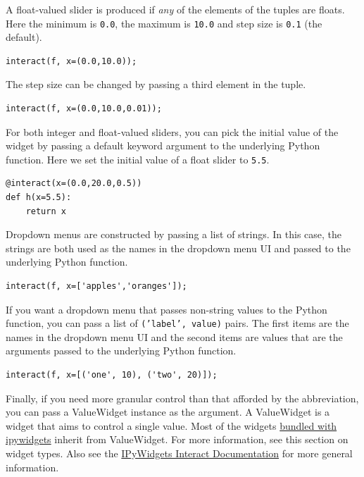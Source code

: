 A float-valued slider is produced if \textit{any} of the elements of the tuples are floats. Here the minimum is \texttt{0.0}, the maximum is \texttt{10.0} and step size is \texttt{0.1} (the default).

\begin{verbatim}
interact(f, x=(0.0,10.0));
\end{verbatim}

The step size can be changed by passing a third element in the tuple.

\begin{verbatim}
interact(f, x=(0.0,10.0,0.01));
\end{verbatim}

For both integer and float-valued sliders, you can pick the initial value of the widget by passing a default keyword argument to the underlying Python function. Here we set the initial value of a float slider to \texttt{5.5}.

\begin{verbatim}
@interact(x=(0.0,20.0,0.5))
def h(x=5.5):
    return x
\end{verbatim}

Dropdown menus are constructed by passing a list of strings. In this case, the strings are both used as the names in the dropdown menu UI and passed to the underlying Python function.

\begin{verbatim}
interact(f, x=['apples','oranges']);
\end{verbatim}

If you want a dropdown menu that passes non-string values to the Python function, you can pass a list of \texttt{('label', value)} pairs. The first items are the names in the dropdown menu UI and the second items are values that are the arguments passed to the underlying Python function.

\begin{verbatim}
interact(f, x=[('one', 10), ('two', 20)]);
\end{verbatim}

Finally, if you need more granular control than that afforded by the abbreviation, you can pass a ValueWidget instance as the argument. A ValueWidget is a widget that aims to control a single value. Most of the widgets \href{https://ipywidgets.readthedocs.io/en/latest/examples/Widget\%20List.html}{bundled with ipywidgets} inherit from ValueWidget. For more information, see this section on widget types.
Also see the \href{https://ipywidgets.readthedocs.io/en/latest/examples/Using\%20Interact.html}{IPyWidgets Interact Documentation} for more general information.

